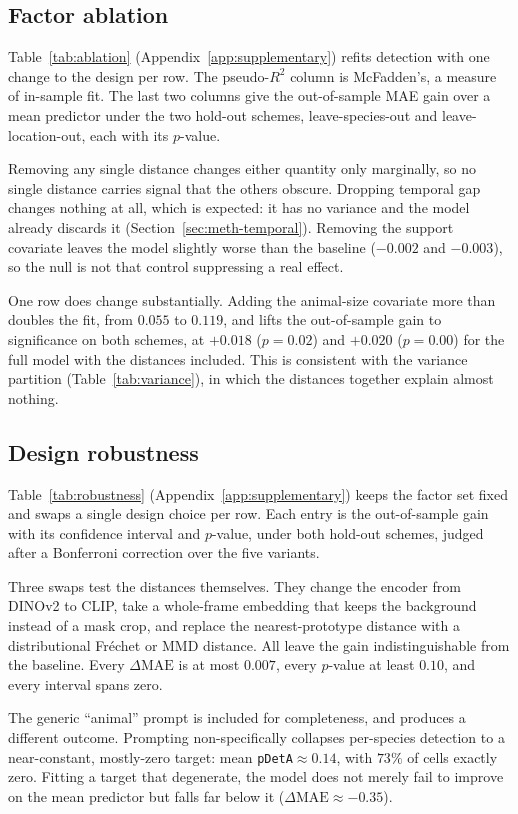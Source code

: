 \subsection{Factor ablation}
Table~\ref{tab:ablation} (Appendix~\ref{app:supplementary}) refits detection with one change to the design
per row. The pseudo-$R^2$ column is McFadden's, a measure of in-sample fit. The last two columns give the
out-of-sample MAE gain over a mean predictor under the two hold-out schemes, leave-species-out and leave-location-out, each with its $p$-value.

Removing any single distance changes either quantity only marginally, so no single distance carries signal
that the others obscure. Dropping temporal gap changes nothing at all, which is expected: it has no variance and the
model already discards it (Section~\ref{sec:meth-temporal}). Removing the support covariate leaves the model
slightly worse than the baseline ($-0.002$ and $-0.003$), so the null is not that control suppressing a real
effect.

One row does change substantially. Adding the animal-size covariate more than doubles the fit, from $0.055$
to $0.119$, and lifts the out-of-sample gain to significance on both schemes, at $+0.018$ ($p=0.02$) and
$+0.020$ ($p=0.00$) for the full model with the distances included. This is consistent with the variance
partition (Table~\ref{tab:variance}), in which the distances together explain almost nothing.

\subsection{Design robustness}
Table~\ref{tab:robustness} (Appendix~\ref{app:supplementary}) keeps the factor set fixed and swaps a single
design choice per row. Each entry is the out-of-sample gain with its confidence interval and $p$-value, under both hold-out schemes, judged after a
Bonferroni correction over the five variants.

Three swaps test the distances themselves. They change the encoder from DINOv2 to CLIP, take a whole-frame
embedding that keeps the background instead of a mask crop, and replace the nearest-prototype distance with a
distributional Fr\'echet or MMD distance. All leave the gain indistinguishable from the baseline. Every
$\Delta\mathrm{MAE}$ is at most $0.007$, every $p$-value at least $0.10$, and every interval spans zero.

The generic ``animal'' prompt is included for completeness, and produces a different outcome. Prompting
non-specifically collapses per-species detection to a near-constant, mostly-zero target: mean
\texttt{pDetA}$\approx0.14$, with $73\%$ of cells exactly zero. Fitting a target that degenerate, the model
does not merely fail to improve on the mean predictor but falls far below it ($\Delta\mathrm{MAE}\approx-0.35$).

